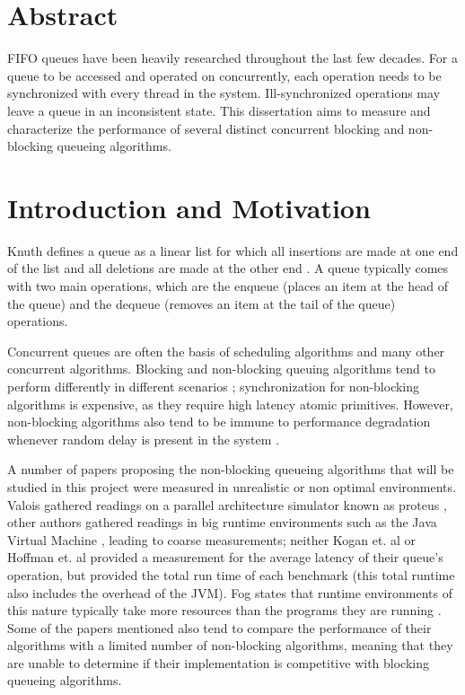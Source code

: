\documentclass[a4paper, 12pt, titlepage]{article}
\begin{document}
\begin{singlespace}
\section{Abstract}
  FIFO queues have been heavily researched throughout the last few decades. For a queue to be accessed and operated on concurrently, each operation needs to be synchronized with every thread in the system. Ill-synchronized operations may leave a queue in an inconsistent state. This dissertation aims to measure and characterize the performance of several distinct concurrent blocking and non-blocking queueing algorithms.

\section{Introduction and Motivation}
Knuth defines a queue as a linear list for which all insertions are made at one end of the list and all deletions are made at the other end \cite{knuth1968art}. A queue typically comes with two main operations, which are the enqueue (places an item at the head of the queue) and the dequeue (removes an item at the tail of the queue) operations.

Concurrent queues are often the basis of scheduling algorithms and many other concurrent algorithms. Blocking and non-blocking queuing algorithms tend to perform differently in different scenarios \cite{kogan2011wait,valois1995lock,hoffman2007baskets,preshinglockcontentionslow}; synchronization for non-blocking algorithms is expensive, as they require high latency atomic primitives. However, non-blocking algorithms also tend to be immune to performance degradation whenever random delay is present in the system \cite{valois1995lock}. 

A number of papers proposing the non-blocking queueing algorithms that will be studied in this project were measured in unrealistic or non optimal environments. Valois gathered readings on a parallel architecture simulator known as proteus \cite{valois1995lock}, other authors gathered readings in big runtime environments such as the Java Virtual Machine \cite{kogan2011wait, hoffman2007baskets}, leading to coarse measurements; neither Kogan et. al or Hoffman et. al provided a measurement for the average latency of their queue's operation, but provided the total run time of each benchmark (this total runtime also includes the overhead of the JVM). Fog states that runtime environments of this nature typically take more resources than the programs they are running \cite{fog2020optimizing}. Some of the papers mentioned \cite{hoffman2007baskets,kogan2011wait} also tend to compare the performance of their algorithms with a limited number of non-blocking algorithms, meaning that they are unable to determine if their implementation is competitive with blocking queueing algorithms.


\end{singlespace}
\end{document}

